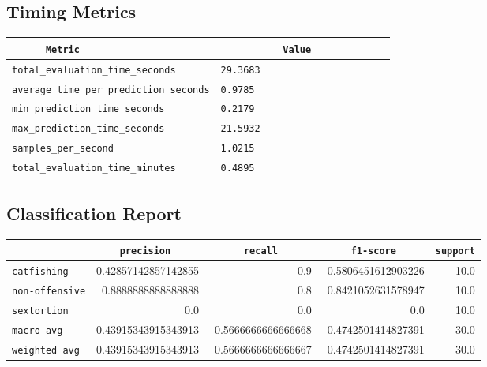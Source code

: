 \documentclass{article}
\begin{document}
\subsection{Timing Metrics}

\begin{center}
\begin{tabular}{l | l} \hline
    \verb|      Metric     | & \verb|           Value           | \\ \hline
    \hline
    \verb|total_evaluation_time_seconds| & \verb|29.3683                      | \\ \hline
    \verb|average_time_per_prediction_seconds| & \verb|0.9785                       | \\ \hline
    \verb|min_prediction_time_seconds| & \verb|0.2179                       | \\ \hline
    \verb|max_prediction_time_seconds| & \verb|21.5932                      | \\ \hline
    \verb|samples_per_second| & \verb|1.0215                       | \\ \hline
    \verb|total_evaluation_time_minutes| & \verb|0.4895                       | \\ \hline
\end{tabular}
\end{center}

\subsection{Classification Report}

\begin{center}
\begin{tabular}{l | r | r | r | r} \hline
    \verb|            | & \verb|    precision     | & \verb|      recall      | & \verb|     f1-score     | & \verb|support| \\ \hline
    \hline
    \verb|catfishing | & 0.42857142857142855 & 0.9 & 0.5806451612903226 &    10.0 \\ \hline
    \verb|non-offensive| & 0.8888888888888888 & 0.8 & 0.8421052631578947 &    10.0 \\ \hline
    \verb|sextortion | & 0.0 & 0.0 & 0.0 &    10.0 \\ \hline
    \verb|macro avg  | & 0.43915343915343913 & 0.5666666666666668 & 0.4742501414827391 &    30.0 \\ \hline
    \verb|weighted avg| & 0.43915343915343913 & 0.5666666666666667 & 0.4742501414827391 &    30.0 \\ \hline
\end{tabular}
\end{center}
\end{document}
